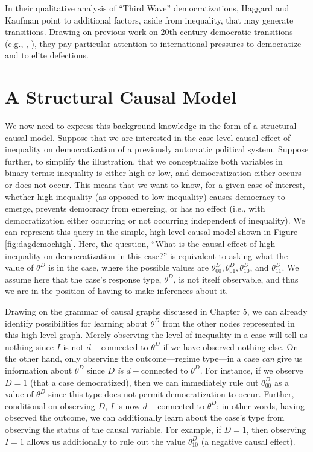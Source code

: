 \documentclass[12pt,]{book}
\begin{document}
In their qualitative analysis of ``Third Wave'' democratizations, Haggard and Kaufman point to additional factors, aside from inequality, that may generate transitions. Drawing on previous work on 20th century democratic transitions (e.g., \citet{huntington1993third}, \citet{linz1996problems}), they pay particular attention to international pressures to democratize and to elite defections.

\hypertarget{a-structural-causal-model}{%
\section{A Structural Causal Model}\label{a-structural-causal-model}}

We now need to express this background knowledge in the form of a structural causal model. Suppose that we are interested in the case-level causal effect of inequality on democratization of a previously autocratic political system. Suppose further, to simplify the illustration, that we conceptualize both variables in binary terms: inequality is either high or low, and democratization either occurs or does not occur. This means that we want to know, for a given case of interest, whether high inequality (as opposed to low inequality) causes democracy to emerge, prevents democracy from emerging, or has no effect (i.e., with democratization either occurring or not occurring independent of inequality). We can represent this query in the simple, high-level causal model shown in Figure \ref{fig:dagdemochigh}. Here, the question, ``What is the causal effect of high inequality on democratization in this case?'' is equivalent to asking what the value of \(\theta^D\) is in the case, where the possible values are \(\theta_{00}^D, \theta_{01}^D, \theta_{10}^D\), and \(\theta_{11}^D\). We assume here that the case's response type, \(\theta^D\), is not itself observable, and thus we are in the position of having to make inferences about it.

Drawing on the grammar of causal graphs discussed in Chapter 5, we can already identify possibilities for learning about \(\theta^D\) from the other nodes represented in this high-level graph. Merely observing the level of inequality in a case will tell us nothing since \(I\) is not \(d-\)connected to \(\theta^D\) if we have observed nothing else. On the other hand, only observing the outcome---regime type---in a case \emph{can} give us information about \(\theta^D\) since \(D\) \emph{is} \(d-\)connected to \(\theta^D\). For instance, if we observe \(D=1\) (that a case democratized), then we can immediately rule out \(\theta_{00}^D\) as a value of \(\theta^D\) since this type does not permit democratization to occur. Further, conditional on observing \(D\), \(I\) is now \(d-\)connected to \(\theta^D\): in other words, having observed the outcome, we can additionally learn about the case's type from observing the status of the causal variable. For example, if \(D=1\), then observing \(I=1\) allows us additionally to rule out the value \(\theta_{10}^D\) (a negative causal effect).
\end{document}
